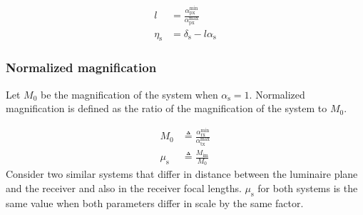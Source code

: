 \begin{align}
	l &= \frac{\alpha_{\text{px}}^{\text{min}}}{\alpha_{\text{px}}^{\text{max}}}\label{eqESl}\\
	\eta_{\text{s}} &= \delta_{\text{s}} - l\alpha_{\text{s}}\label{eqES2}
\end{align}

\subsubsection{Normalized magnification}
\label{subsubsec:frameworkMagnification}
Let $M_0$ be the magnification of the system when $\alpha_{\text{s}}=1$. Normalized magnification is defined as the ratio of the magnification of the system to $M_0$.

\begin{align}
	M_{0} &\triangleq \frac{\alpha_{\text{rx}}^{\text{min}}}{\alpha_{\text{tx}}^{\text{max}}}\label{eqM0}\\
	\mu_{\text{s}} &\triangleq \frac{M_{\text{im}}}{M_{0}}\label{eqMS}
\end{align}
Consider two similar systems that differ in distance between the luminaire plane and the receiver and also in the receiver focal lengths. $\mu_{\text{s}}$ for both systems is the same value when both parameters differ in scale by the same factor.
